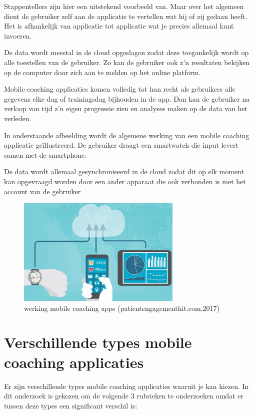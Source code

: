 Stappentellers zijn hier een uitstekend voorbeeld van. Maar over het algemeen dient de gebruiker zelf aan de applicatie te vertellen wat hij of zij gedaan heeft. Het is afhankelijk van applicatie tot applicatie wat je precies allemaal kunt invoeren. 

De data wordt meestal in de cloud opgeslagen zodat deze toegankelijk wordt op alle toestellen van de gebruiker. Zo kan de gebruiker ook z’n resultaten bekijken op de computer door zich aan te melden op het online platform.

Mobile coaching applicaties komen volledig tot hun recht als gebruikers alle gegevens elke dag of trainingsdag bijhouden in de app. Dan kan de gebruiker na verloop van tijd z’n eigen progressie zien en analyses maken op de data van het verleden.

In onderstaande afbeelding wordt de algemene werking van een mobile coaching applicatie geïllustreerd. De gebruiker draagt een smartwatch die input levert samen met de smartphone. 

De data wordt allemaal gesynchroniseerd in de cloud zodat dit op elk moment kan opgevraagd worden door een ander apparaat die ook verbonden is met het account van de gebruiker

\begin{figure}[h!]
\centering
\includegraphics[width=0.7\textwidth]{img/cloud-synch.JPG}
\caption{werking mobile coaching apps (patientengagementhit.com,2017)}
\end{figure}

\newpage
\section{Verschillende types mobile coaching applicaties}
\label{sec:types}

Er zijn verschillende types mobile coaching applicaties waaruit je kan kiezen. In dit onderzoek is gekozen om de volgende 3 rubrieken te onderzoeken omdat er tussen deze types een significant verschil is:

